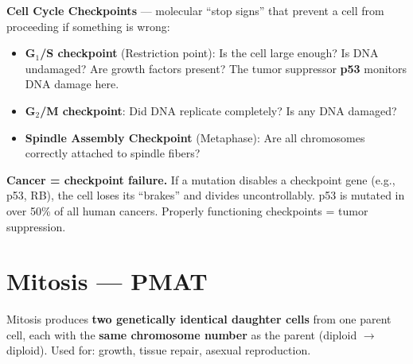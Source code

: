 \documentclass[11pt, letterpaper]{article}
\begin{document}
\textbf{Cell Cycle Checkpoints} --- molecular ``stop signs'' that prevent a cell from
proceeding if something is wrong:
\begin{itemize}[noitemsep]
  \item \textbf{G$_1$/S checkpoint} (Restriction point): Is the cell large enough? Is DNA undamaged? Are growth factors present? The tumor suppressor \textbf{p53} monitors DNA damage here.
  \item \textbf{G$_2$/M checkpoint}: Did DNA replicate completely? Is any DNA damaged?
  \item \textbf{Spindle Assembly Checkpoint} (Metaphase): Are all chromosomes correctly attached to spindle fibers?
\end{itemize}

\begin{tcolorbox}[colback=part5bg, colframe=sectionteal, arc=3pt, boxrule=1pt]
\textbf{Cancer = checkpoint failure.} If a mutation disables a checkpoint gene (e.g., p53,
RB), the cell loses its ``brakes'' and divides uncontrollably. p53 is mutated in over 50\%
of all human cancers. Properly functioning checkpoints = tumor suppression.
\end{tcolorbox}

\section*{Mitosis --- PMAT}

Mitosis produces \textbf{two genetically identical daughter cells} from one parent cell,
each with the \textbf{same chromosome number} as the parent (diploid $\to$ diploid). Used
for: growth, tissue repair, asexual reproduction.
\end{document}
